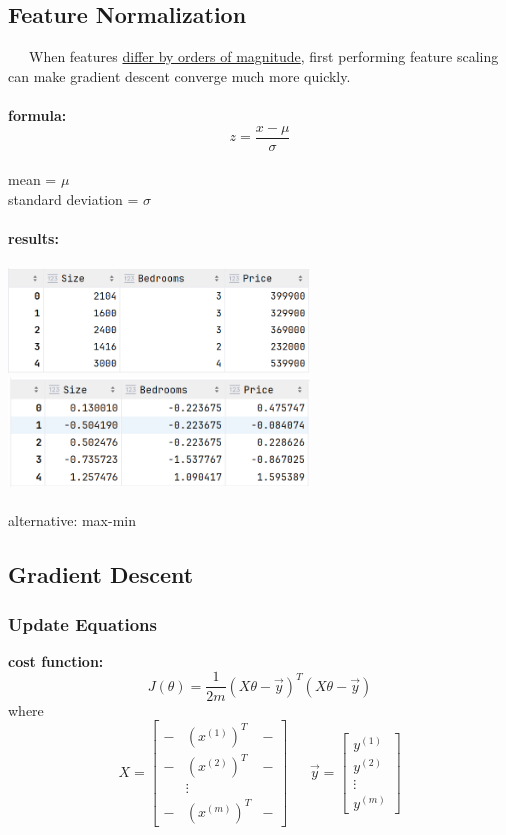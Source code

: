 \documentclass[a4paper, 12pt]{book}
\begin{document}
		\subsection{Feature Normalization} 
		\ \ \ When features \underline{differ by orders of magnitude}, first performing feature scaling can make gradient descent converge much more quickly. \\ \\
	\textbf{formula: } \\
	$$z=\frac{x-\mu}{\sigma}$$ \\
	{\footnotesize
	mean = $\mu$ \\
	standard deviation = $\sigma$ 
	} \\ \\ \textbf{results: } \\ \\
	\includegraphics[width=8cm,keepaspectratio]{head} 
	\includegraphics[width=8cm,keepaspectratio]{normalized} \\ \\
	alternative: max-min
		\subsection{Gradient Descent}
			\subsubsection{Update Equations}
	\textbf{cost function:} $$J(\theta)=\frac{1}{2m}(X\theta-\vec{y})^T(X\theta-\vec{y})$$
	where \\
	\[
	X=
	\begin{bmatrix}
		- & (x^{(1)})^T & - \\
		- & (x^{(2)})^T & - \\
		  &   \vdots  &   \\
		- & (x^{(m)})^T & - 
	\end{bmatrix} \ \ \ \ \ \ \
	\vec{y}=
	\begin{bmatrix}
		y^{(1)} \\ y^{(2)} \\ \vdots \\ y^{(m)}
	\end{bmatrix}
	\]
\end{document}
